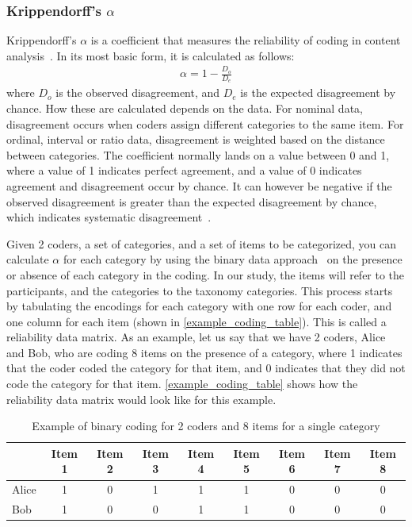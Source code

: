 \subsubsection*{Krippendorff's \(\alpha \)}
Krippendorff's \(\alpha \) is a coefficient that measures the reliability of coding in content analysis~\cite{krippendorff_content_2004}. In its most basic form, it is calculated as follows:
\begin{align}
    \alpha = 1 - \frac{D_o}{D_e}
\end{align}
where \(D_o\) is the observed disagreement, and \(D_e\) is the expected disagreement by chance. How these are calculated depends on the data. For nominal data, disagreement occurs when coders assign different categories to the same item. For ordinal, interval or ratio data, disagreement is weighted based on the distance between categories. 
The coefficient normally lands on a value between 0 and 1, where a value of 1 indicates perfect agreement, and a value of 0 indicates agreement and disagreement occur by chance. It can however be negative if the observed disagreement is greater than the expected disagreement by chance, which indicates systematic disagreement~\cite{krippendorff_content_2004}.

Given 2 coders, a set of categories, and a set of items to be categorized, you can calculate \(\alpha \) for each category by using the binary data approach~\cite{krippendorff_content_2004} on the presence or absence of each category in the coding. In our study, the items will refer to the participants, and the categories to the taxonomy categories. This process starts by tabulating the encodings for each category with one row for each coder, and one column for each item (shown in \autoref{example_coding_table}). This is called a reliability data matrix. As an example, let us say that we have 2 coders, Alice and Bob, who are coding 8 items on the presence of a category, where 1 indicates that the coder coded the category for that item, and 0 indicates that they did not code the category for that item. \autoref{example_coding_table} shows how the reliability data matrix would look like for this example.
\begin{table}
    \centering
    \caption{Example of binary coding for 2 coders and 8 items for a single category}
    \label{example_coding_table}
    \begin{tabular}{l|cccccccc}
            & Item 1 & Item 2 & Item 3 & Item 4 & Item 5 & Item 6 & Item 7 & Item 8 \\
            \hline
            Alice & 1 & 0 & 1 & 1 & 1 & 0 & 0 & 0 \\
            Bob   & 1 & 0 & 0 & 1 & 1 & 0 & 0 & 0
    \end{tabular}
\end{table}

